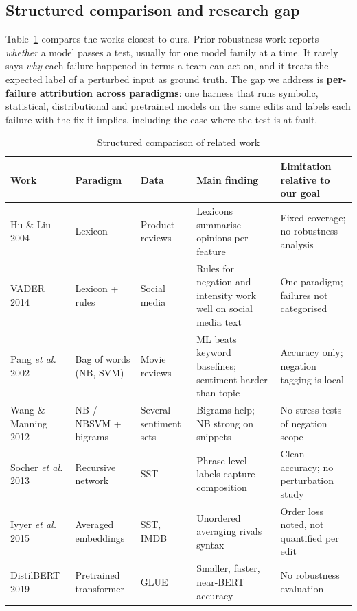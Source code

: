 \documentclass[conference]{IEEEtran}
\begin{document}
\subsection{Structured comparison and research gap}
Table~\ref{tab:lit} compares the works closest to ours. Prior robustness work reports \emph{whether}
a model passes a test, usually for one model family at a time. It rarely says \emph{why} each
failure happened in terms a team can act on, and it treats the expected label of a perturbed
input as ground truth. The gap we address is \textbf{per-failure attribution across paradigms}:
one harness that runs symbolic, statistical, distributional and pretrained models on the same
edits and labels each failure with the fix it implies, including the case where the test is at
fault.

\begin{table}[t]
\centering
\caption{Structured comparison of related work}
\label{tab:lit}
\footnotesize
\begin{tabular}{@{}p{3.0cm}p{2.6cm}p{2.5cm}p{3.6cm}p{4.6cm}@{}}
\toprule
\textbf{Work} & \textbf{Paradigm} & \textbf{Data} & \textbf{Main finding} & \textbf{Limitation relative to our goal} \\
\midrule
Hu \& Liu 2004~\cite{hu2004} & Lexicon & Product reviews & Lexicons summarise opinions per feature & Fixed coverage; no robustness analysis \\
VADER 2014~\cite{hutto2014} & Lexicon + rules & Social media & Rules for negation and intensity work well on social media text & One paradigm; failures not categorised \\
Pang \emph{et al.} 2002~\cite{pang2002} & Bag of words (NB, SVM) & Movie reviews & ML beats keyword baselines; sentiment harder than topic & Accuracy only; negation tagging is local \\
Wang \& Manning 2012~\cite{wang2012} & NB / NBSVM + bigrams & Several sentiment sets & Bigrams help; NB strong on snippets & No stress tests of negation scope \\
Socher \emph{et al.} 2013~\cite{socher2013} & Recursive network & SST & Phrase-level labels capture composition & Clean accuracy; no perturbation study \\
Iyyer \emph{et al.} 2015~\cite{iyyer2015} & Averaged embeddings & SST, IMDB & Unordered averaging rivals syntax & Order loss noted, not quantified per edit \\
DistilBERT 2019~\cite{sanh2019} & Pretrained transformer & GLUE & Smaller, faster, near-BERT accuracy & No robustness evaluation \\

\end{tabular}
\end{table}
\end{document}
